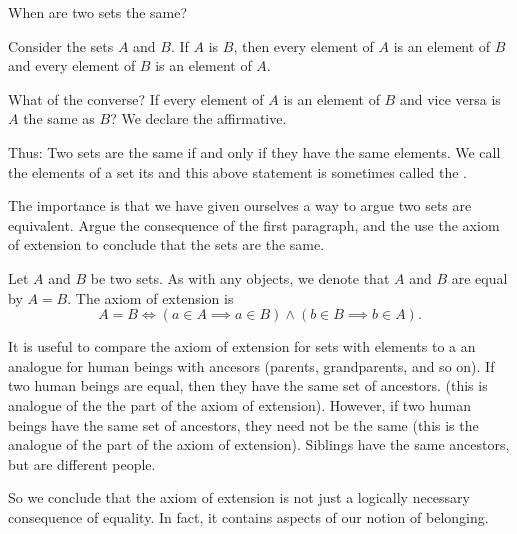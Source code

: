
\sbasic




\sstart
{}


When are two
sets the same?


Consider the sets
$A$ and $B$.
If $A$ is $B$,
then every element of
$A$ is an element of
$B$ and every element
of $B$ is an element of
$A$.

What of the converse?
If every element of $A$
is an element of $B$
and vice versa is $A$
the same as $B$?
We declare the affirmative.

Thus:
Two sets are
the same if and only
if they have the same
elements.
We call the elements of a set
its  and
this above statement
is sometimes called the
.

The importance is that we have
given ourselves a way to argue
two sets are equivalent. Argue
the consequence of the first
paragraph, and the use the
axiom of extension to conclude
that the sets are the same.


Let $A$ and $B$ be
two sets.
As with any objects,
we denote that
$A$ and $B$
are equal
by $A = B$.
The axiom of extension is
\[
  A = B \Leftrightarrow (a \in A \implies a \in B) \land (b \in B \implies b \in A).
\]


It is useful to compare the axiom
of extension for sets with elements
to a an analogue for human beings
with ancesors (parents, grandparents,
and so on).
If two human beings are equal,
then they have the same set of ancestors.
(this is analogue of the the  part of
the axiom of extension).
However, if two human beings have
the same set of ancestors, they need
not be the same (this is the analogue of the
 part of the axiom
of extension).
Siblings have the same ancestors,
but are different people.

So we conclude that the axiom of extension
is not just a logically necessary consequence
of equality.
In fact, it contains aspects of our notion
of belonging.
\strats
